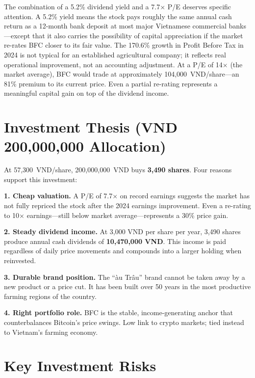 The combination of a 5.2\% dividend yield and a 7.7$\times$ P/E deserves specific attention. A 5.2\% yield means the stock pays roughly the same annual cash return as a 12-month bank deposit at most major Vietnamese commercial banks---except that it also carries the possibility of capital appreciation if the market re-rates BFC closer to its fair value. The 170.6\% growth in Profit Before Tax in 2024 is not typical for an established agricultural company; it reflects real operational improvement, not an accounting adjustment. At a P/E of 14$\times$ (the market average), BFC would trade at approximately 104,000~VND/share---an 81\% premium to its current price. Even a partial re-rating represents a meaningful capital gain on top of the dividend income.

\section{Investment Thesis (VND 200,000,000 Allocation)}

At 57,300~VND/share, 200,000,000~VND buys \textbf{3,490 shares}. Four reasons support this investment:

\textbf{1. Cheap valuation.} A P/E of 7.7$\times$ on record earnings suggests the market has not fully repriced the stock after the 2024 earnings improvement. Even a re-rating to 10$\times$ earnings---still below market average---represents a 30\% price gain.

\textbf{2. Steady dividend income.} At 3,000 VND per share per year, 3,490 shares produce annual cash dividends of \textbf{10,470,000 VND}. This income is paid regardless of daily price movements and compounds into a larger holding when reinvested.

\textbf{3. Durable brand position.} The ``\DH\`{a}u Tr\^{a}u'' brand cannot be taken away by a new product or a price cut. It has been built over 50 years in the most productive farming regions of the country.

\textbf{4. Right portfolio role.} BFC is the stable, income-generating anchor that counterbalances Bitcoin's price swings. Low link to crypto markets; tied instead to Vietnam's farming economy.

\section{Key Investment Risks}

